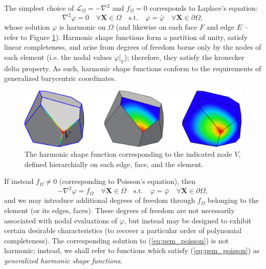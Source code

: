 	The simplest choice of $\mathcal{L}_{\Omega} = -\nabla^2$ and $f_{\Omega} = 0$ corresponds to Laplace's equation:
	\begin{equation}
		\nabla^2 \varphi = 0 \quad \forall \mathbf{X} \in \Omega \quad \text{s.t.} \quad \varphi = \bar{\varphi} \quad \forall \mathbf{X} \in \partial \Omega,
		\label{eq:pem_laplace}
	\end{equation}
	whose solution $\varphi$ is harmonic on $\Omega$ (and likewise on each face $F$ and edge $E$ -- refer to Figure \ref{fig:harmonic_sfs}). Harmonic shape functions form a partition of unity, satisfy linear completeness, and arise from degrees of freedom borne only by the nodes of each element (i.e. the nodal values $\varphi|_V$); therefore, they satisfy the kronecker delta property. As such, harmonic shape functions conform to the requirements of generalized barycentric coordinates.
	
\begin{figure} [!ht]
	\centering
	\includegraphics[width = 6.0in]{figures/harmonic_sfs.pdf}
	\caption{The harmonic shape function corresponding to the indicated node $V$, defined hierarchially on each edge, face, and the element.}
	\label{fig:harmonic_sfs}
\end{figure}
	
	If instead $f_{\Omega} \neq 0$ (corresponding to Poisson's equation), then
	\begin{equation}
		-\nabla^2 \varphi = f_{\Omega} \quad \forall \mathbf{X} \in \Omega \quad \text{s.t.} \quad \varphi = \bar{\varphi} \quad \forall \mathbf{X} \in \partial \Omega,
		\label{eq:pem_poisson}
	\end{equation}
	and we may introduce additional degrees of freedom through $f_{\Omega}$ belonging to the element (or its edges, faces). These degrees of freedom are not necessarily associated with nodal evaluations of $\varphi$, but instead may be designed to exhibit certain desirable characteristics (to recover a particular order of polynomial completeness). The corresponding solution to (\ref{eq:pem_poisson}) is not harmonic; instead, we shall refer to functions which satisfy (\ref{eq:pem_poisson}) as \textit{generalized harmonic shape functions}.
	
